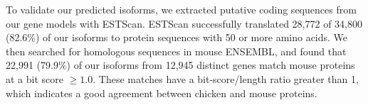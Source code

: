 \documentclass[10pt]{article}
\begin{document}
To validate our predicted isoforms, we extracted putative coding sequences from
our gene models with ESTScan\cite{Iseli:1999vd}.  ESTScan successfully
translated 28,772 of 34,800 (82.6\%) of our isoforms to protein sequences with
50 or more amino acids.  We then searched for homologous sequences in mouse
ENSEMBL, and found that 22,991 (79.9\%) of our isoforms from 12,945 distinct
genes match mouse proteins at a bit score $\ge1.0$.
These matches have a bit-score/length ratio greater than 1, which indicates a
good agreement between chicken and mouse proteins.


% 
% 
% 
% 
\end{document}
